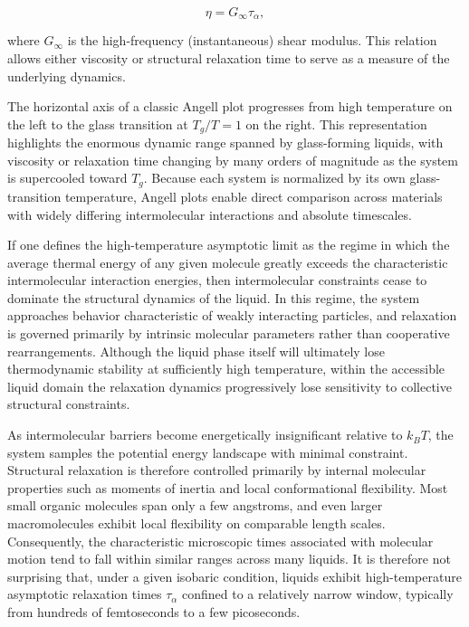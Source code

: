 \begin{equation}
	\eta = G_\infty \tau_\alpha,
\end{equation}

\noindent where $G_\infty$ is the high-frequency (instantaneous) shear modulus. This relation allows either viscosity or structural relaxation time to serve as a measure of the underlying dynamics.

The horizontal axis of a classic Angell plot progresses from high temperature on the left to the glass transition at $T_g/T = 1$ on the right. This representation highlights the enormous dynamic range spanned by glass-forming liquids, with viscosity or relaxation time changing by many orders of magnitude as the system is supercooled toward $T_g$. Because each system is normalized by its own glass-transition temperature, Angell plots enable direct comparison across materials with widely differing intermolecular interactions and absolute timescales.

If one defines the high-temperature asymptotic limit as the regime in which the average thermal energy of any given molecule greatly exceeds the characteristic intermolecular interaction energies, then intermolecular constraints cease to dominate the structural dynamics of the liquid. In this regime, the system approaches behavior characteristic of weakly interacting particles, and relaxation is governed primarily by intrinsic molecular parameters rather than cooperative rearrangements. Although the liquid phase itself will ultimately lose thermodynamic stability at sufficiently high temperature, within the accessible liquid domain the relaxation dynamics progressively lose sensitivity to collective structural constraints.

As intermolecular barriers become energetically insignificant relative to $k_{B}T$, the system samples the potential energy landscape with minimal constraint. Structural relaxation is therefore controlled primarily by internal molecular properties such as moments of inertia and local conformational flexibility. Most small organic molecules span only a few angstroms, and even larger macromolecules exhibit local flexibility on comparable length scales. Consequently, the characteristic microscopic times associated with molecular motion tend to fall within similar ranges across many liquids. It is therefore not surprising that, under a given isobaric condition, liquids exhibit high-temperature asymptotic relaxation times $\tau_{\alpha}$ confined to a relatively narrow window, typically from hundreds of femtoseconds to a few picoseconds.

